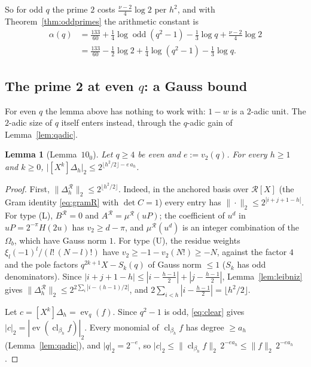 \documentclass[11pt]{amsart}
\newtheorem{lemma}[theorem]{Lemma}
\theoremstyle{definition}
\theoremstyle{remark}
\numberwithin{equation}{section}
\newcommand{\cR}{\mathcal{R}}
\newcommand{\odd}{\operatorname{odd}}
\newcommand{\cl}{\operatorname{cl}}
\newcommand{\ev}{\operatorname{ev}}
\begin{document}
So for odd $q$ the prime $2$ costs $\frac{\nu-2}4\log2$ per $h^2$, and with Theorem~\ref{thm:oddprimes} the arithmetic
constant is
\begin{equation}\label{eq:alphaodd}
\begin{split}
  \alpha(q)&=\frac{133}{60}+\frac14\log\odd(q^2-1)-\frac13\log q+\frac{\nu-2}4\log2\\
  &=\frac{133}{60}-\frac12\log2+\frac14\log(q^2-1)-\frac13\log q .
\end{split}
\end{equation}

\subsection{The prime 2 at even \texorpdfstring{$q$}{q}: a Gauss bound}
For even $q$ the lemma above has nothing to work with: $1-w$ is a $2$-adic unit. The $2$-adic size of $q$ itself enters
instead, through the $q$-adic gain of Lemma~\ref{lem:qadic}.

\begin{lemma}[Lemma~$10_0$]\label{lem:ten0}
Let $q\ge4$ be even and $e:=v_2(q)$. For every $h\ge1$ and $k\ge0$,
$\bigl|[X^k]\Delta_h\bigr|_2\le2^{\lfloor h^2/2\rfloor-e\,a_h}$.
\end{lemma}

\begin{proof}
First, $\|\Delta^{\cR}_h\|_2\le2^{\lfloor h^2/2\rfloor}$. Indeed, in the anchored basis over $\cR[X]$ (the Gram identity
\eqref{eq:gramR} with $\det C=1$) every entry has $\|\cdot\|_2\le2^{|i+j+1-h|}$. For type (L), $B^{\cR}=0$ and
$A^{\cR}=\mu^{\cR}(uP)$; the coefficient of $u^d$ in $uP=2^{-\pi}H(2u)$ has $v_2\ge d-\pi$, and $\mu^{\cR}(u^d)$ is an integer
combination of the $\Omega_b$, which have Gauss norm $1$. For type (U), the residue weights
$\xi_l(-1)^l/(l!\,(N-l)!)$ have $v_2\ge-1-v_2(N!)\ge-N$, against the factor $4$ and the pole factors
$q^{2k+1}X-S_k(q)$ of Gauss norm $\le1$ ($S_k$ has odd denominators). Since
$|i+j+1-h|\le|i-\frac{h-1}2|+|j-\frac{h-1}2|$, Lemma~\ref{lem:leibniz} gives $\|\Delta^{\cR}_h\|_2\le2^{2\sum_i|i-(h-1)/2|}$,
and $2\sum_{i<h}|i-\frac{h-1}2|=\lfloor h^2/2\rfloor$.

Let $c=[X^k]\Delta_h=\ev_q(f)$. Since $q^2-1$ is odd, \eqref{eq:clear} gives $|c|_2=|\ev(\cl_{\beta_h}f)|_2$. Every monomial of
$\cl_{\beta_h}f$ has degree $\ge a_h$ (Lemma~\ref{lem:qadic}), and $|q|_2=2^{-e}$, so
$|c|_2\le\|\cl_{\beta_h}f\|_2\,2^{-ea_h}\le\|f\|_2\,2^{-ea_h}$.
\end{proof}
\end{document}
